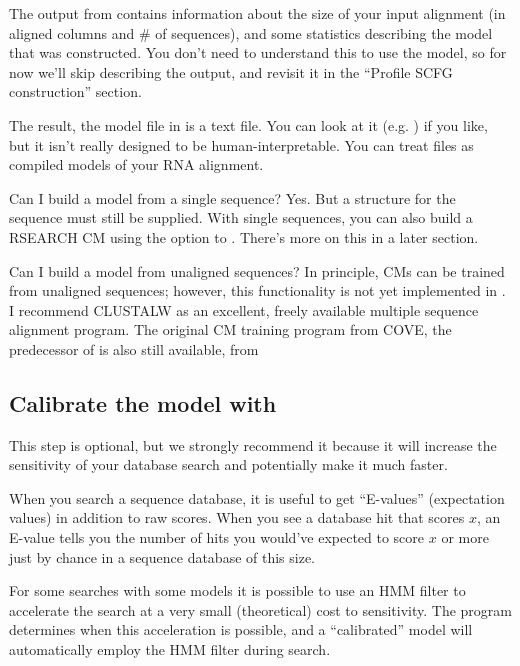 The output from  contains information about the size of your
input alignment (in aligned columns and \# of sequences), and some statistics
describing the model that was constructed. You don't need to understand this to
use the model, so for now we'll skip describing the output, and
revisit it in the ``Profile SCFG construction'' section.

The result, the model file in  is a text file. You can
look at it (e.g. ) if you like, but it isn't really
designed to be human-interpretable. You can treat  files as
compiled models of your RNA alignment.

\begin{srefaq}{Can I build a model from a single sequence?}
Yes. But a structure for the sequence must still be supplied.
With single sequences, you can also build a RSEARCH \cite{KleinEddy03} CM 
using the  option to . There's more on
this in a later section.
\end{srefaq}

\begin{srefaq}{Can I build a model from unaligned sequences?}
In principle, CMs can be trained from unaligned sequences;
however, this functionality is not yet implemented in .  I
recommend CLUSTALW as an excellent, freely available multiple sequence
alignment program. The original  CM training
program from COVE, the predecessor of  is also
still available, from
\end{srefaq}

\subsection{Calibrate the model with }

This step is optional, but we strongly recommend it because it will
increase the sensitivity of your database search and potentially make
it much faster.

When you search a sequence database, it is useful to get ``E-values''
(expectation values) in addition to raw scores. When you see a
database hit that scores $x$, an E-value tells you the number of hits
you would've expected to score $x$ or more just by chance in a
sequence database of this size. 

For some searches with some models it is possible to use an HMM
filter to accelerate the search at a very small (theoretical) cost to
sensitivity. The  program determines when this 
acceleration is possible, and a ``calibrated'' model will automatically
employ the HMM filter during search.

